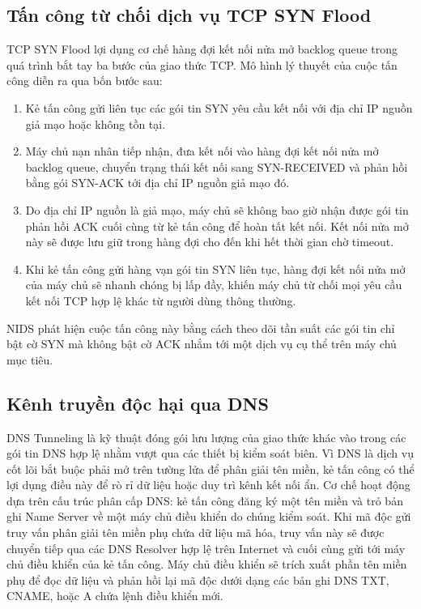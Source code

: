 \subsection{Tấn công từ chối dịch vụ TCP SYN Flood}
TCP SYN Flood lợi dụng cơ chế hàng đợi kết nối nửa mở backlog queue trong quá trình bắt tay ba bước của giao thức TCP.
Mô hình lý thuyết của cuộc tấn công diễn ra qua bốn bước sau:
\begin{enumerate}
    \item Kẻ tấn công gửi liên tục các gói tin SYN yêu cầu kết nối với địa chỉ IP nguồn giả mạo hoặc không tồn tại.
    \item Máy chủ nạn nhân tiếp nhận, đưa kết nối vào hàng đợi kết nối nửa mở backlog queue, chuyển trạng thái kết nối sang SYN-RECEIVED và phản hồi bằng gói SYN-ACK tới địa chỉ IP nguồn giả mạo đó.
    \item Do địa chỉ IP nguồn là giả mạo, máy chủ sẽ không bao giờ nhận được gói tin phản hồi ACK cuối cùng từ kẻ tấn công để hoàn tất kết nối. Kết nối nửa mở này sẽ được lưu giữ trong hàng đợi cho đến khi hết thời gian chờ timeout.
    \item Khi kẻ tấn công gửi hàng vạn gói tin SYN liên tục, hàng đợi kết nối nửa mở của máy chủ sẽ nhanh chóng bị lấp đầy, khiến máy chủ từ chối mọi yêu cầu kết nối TCP hợp lệ khác từ người dùng thông thường.
\end{enumerate}
NIDS phát hiện cuộc tấn công này bằng cách theo dõi tần suất các gói tin chỉ bật cờ SYN mà không bật cờ ACK nhắm tới một dịch vụ cụ thể trên máy chủ mục tiêu.

\subsection{Kênh truyền độc hại qua DNS}
DNS Tunneling là kỹ thuật đóng gói lưu lượng của giao thức khác vào trong các gói tin DNS hợp lệ nhằm vượt qua các thiết bị kiểm soát biên. Vì DNS là dịch vụ cốt lõi bắt buộc phải mở trên tường lửa để phân giải tên miền, kẻ tấn công có thể lợi dụng điều này để rò rỉ dữ liệu hoặc duy trì kênh kết nối ẩn.
Cơ chế hoạt động dựa trên cấu trúc phân cấp DNS: kẻ tấn công đăng ký một tên miền và trỏ bản ghi Name Server về một máy chủ điều khiển do chúng kiểm soát. Khi mã độc gửi truy vấn phân giải tên miền phụ chứa dữ liệu mã hóa, truy vấn này sẽ được chuyển tiếp qua các DNS Resolver hợp lệ trên Internet và cuối cùng gửi tới máy chủ điều khiển của kẻ tấn công. Máy chủ điều khiển sẽ trích xuất phần tên miền phụ để đọc dữ liệu và phản hồi lại mã độc dưới dạng các bản ghi DNS TXT, CNAME, hoặc A chứa lệnh điều khiển mới.

